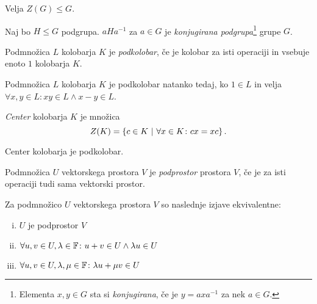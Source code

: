 \begin{opomba}
Velja $Z(G) \leq G$.
\end{opomba}

\begin{definicija}
Naj bo $H \leq G$ podgrupa. $aHa^{-1}$ za $a \in G$ je
\emph{konjugirana podgrupa}\footnote{
Elementa $x,y \in G$ sta si \emph{konjugirana}, če je $y=axa^{-1}$
za nek $a \in G$.} grupe $G$.
\end{definicija}

\begin{definicija}
Podmnožica $L$ kolobarja $K$ je \emph{podkolobar}, če je kolobar za
isti operaciji in vsebuje enoto $1$ kolobarja $K$.
\end{definicija}

\begin{trditev}
Podmnožica $L$ kolobarja $K$ je podkolobar natanko tedaj, ko
$1 \in L$ in velja
$\forall x,y \in L \colon xy \in L \land x-y \in L$.
\end{trditev}

\obvs

\begin{definicija}
\emph{Center} kolobarja
$K$ je množica
\[
Z(K) = \left\{c \in K~\middle\vert~\forall x \in K \colon cx = xc\right\}.
\]
\end{definicija}

\begin{opomba}
Center kolobarja je podkolobar.
\end{opomba}

\begin{definicija}
Podmnožica $U$ vektorskega prostora $V$ je \emph{podprostor}
prostora $V$, če je za isti operaciji tudi sama vektorski prostor.
\end{definicija}

\begin{trditev}
Za podmnožico $U$ vektorskega prostora $V$ so naslednje izjave
ekvivalentne:

\begin{enumerate}[i)]
\item $U$ je podprostor $V$
\item $\forall u,v \in U, \lambda \in \mathbb{F} \colon
u+v \in U \land \lambda u \in U$
\item $\forall u,v \in U, \lambda, \mu \in \mathbb{F} \colon
\lambda u + \mu v \in U$
\end{enumerate}
\end{trditev}

